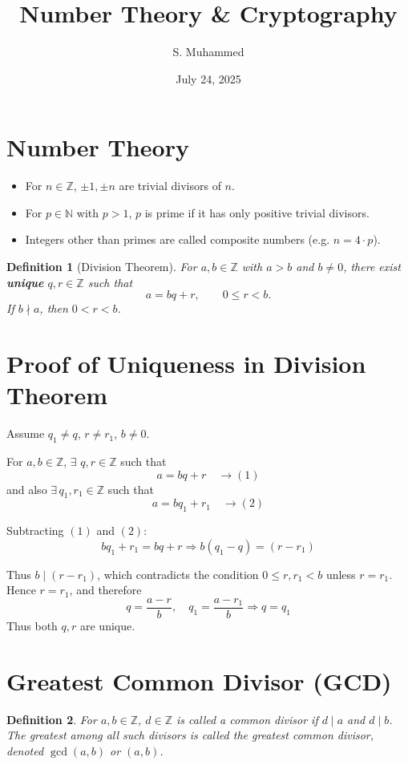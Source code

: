 \documentclass[hidelinks]{article}
\title{\textbf{\LARGE Number Theory \& Cryptography}}
\author{S. Muhammed}
\date{July 24, 2025}
\theoremstyle{mystyle}
\newtheorem{definition}{Definition}[section]
\begin{document}
\maketitle
\section{Number Theory}
\begin{itemize}
    \item For $n \in \mathbb{Z}$, $\pm 1, \pm n$ are trivial divisors of $n$.
    \item For $p \in \mathbb{N}$ with $p > 1$, $p$ is prime if it has only positive trivial divisors.
    \item Integers other than primes are called composite numbers (e.g. $n = 4 \cdot p$).
\end{itemize}

\begin{definition}[Division Theorem]
For $a, b \in \mathbb{Z}$ with $a > b$ and $b \neq 0$, there exist \textbf{unique} $q, r \in \mathbb{Z}$ such that
\[
a = bq + r, \qquad 0 \leq r < b.
\]
If $b \nmid a$, then $0 < r < b$.
\end{definition}

\section{Proof of Uniqueness in Division Theorem}
Assume $q_1 \neq q$, $r \neq r_1$, $b \neq 0$.  

For $a, b \in \mathbb{Z}$, $\exists$  $q, r \in \mathbb{Z}$ such that 
\[
a = bq + r \quad \longrightarrow (1)
\]
and also $\exists \, q_1, r_1 \in \mathbb{Z}$ such that 
\[
a = bq_1 + r_1 \quad \longrightarrow (2)
\]

Subtracting $(1)$ and $(2)$:
$$ bq_1 + r_1 = bq + r \Rightarrow b(q_1 - q) = (r - r_1)$$ 

Thus $b \mid (r-r_1)$, which contradicts the condition $0 \leq r, r_1 < b$ unless $r = r_1$.  
Hence $r = r_1$, and therefore
\[
q = \frac{a-r}{b}, \quad q_1 = \frac{a-r_1}{b} \Rightarrow q = q_1
\]
Thus both $q,r$ are unique.

\section{Greatest Common Divisor (GCD)}
\begin{definition}
For $a, b \in \mathbb{Z}$, $d \in \mathbb{Z}$ is called a \emph{common divisor} if $d \mid a$ and $d \mid b$.  
The greatest among all such divisors is called the \emph{greatest common divisor}, denoted $\gcd(a,b)$ or $(a,b)$.
\end{definition}
\end{document}
